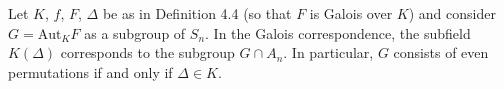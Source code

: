 Let $K$, $f$, $F$, $\Delta$ be as in Definition 4.4 (so that $F$ is Galois over $K$) and consider $G = \mathrm{Aut}_K F$ as a subgroup of $S_n$. In the Galois correspondence, the subfield $K(\Delta)$ corresponds to the subgroup $G \cap A_n$. In particular, $G$ consists of even permutations if and only if $\Delta \in K$.

